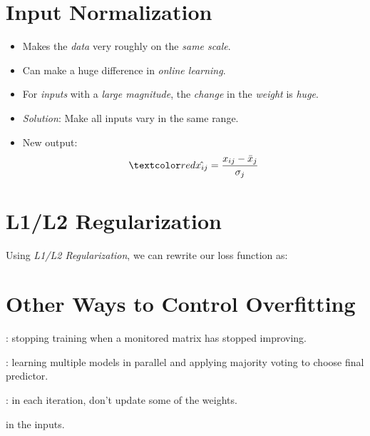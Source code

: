 \documentclass[
	number={5},
	title={Linear Regression}
]{cs584notes}
\begin{document}
\section{Input Normalization}\label{sec:input-normalization}
\begin{itemize}
	\item Makes the \emph{data} very roughly on the \emph{same scale}.
	\item Can make a huge difference in \emph{online learning}.
	\item For \emph{inputs} with a \emph{large magnitude}, the \emph{change} in the \emph{weight} is \emph{huge}.
	\item \emph{Solution}: Make all inputs vary in the same range.
	\item New output:
	\[ \data{ \hat{x_{ij}} = \frac{x_{ij} - \bar{x}_{j}}{\sigma_{j}} } \] %
\end{itemize}

\section{L1/L2 Regularization}\label{sec:l1/l2-regularization}
Using \emph{L1/L2 Regularization}, we can rewrite our loss function as:

\section{Other Ways to Control Overfitting}\label{sec:other-ways-to-control-overfitting}
\begin{description}[font=\emph]
	\item[Early-stopping]: stopping training when a monitored matrix has stopped improving.
	\item[Bagging]: learning multiple models in parallel and applying majority voting to choose final predictor.
	\item[Dropout]: in each iteration, don't update some of the weights.
	\item[Injecting noise] in the inputs.
\end{description}
\end{document}

